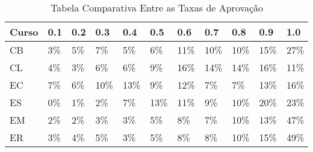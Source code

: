 \begin{table}
\begin{center}
        \begin{tabular}{|p{2cm}| p{1cm}| p{1cm}| p{1cm} | p{1cm} | p{1cm}| p{1cm}
                |p{1cm} | p{1cm} | p{1cm} | p{1cm}|}

        \hline
        \textbf{Curso} & \textbf{0.1} & \textbf{0.2} & \textbf{0.3} & 
        \textbf{0.4} & \textbf{0.5} & \textbf{0.6} & \textbf{0.7} & \textbf{0.8} &
        \textbf{0.9} & \textbf{1.0} \\
        \hline
        \hline
        CB & 3\% & 5\% & 7\% & 5\% & 6\% &
        11\% & 10\% & 10\% & 15\% & 27\% \\
        \hline
        \hline
        CL & 4\% & 3\% & 6\% & 6\% & 9\% &
        16\% & 14\% & 14\% & 16\% & 11\% \\
        \hline
        \hline
        EC & 7\% & 6\% & 10\% & 13\% & 9\% &
        12\% & 7\% & 7\% & 13\% & 16\% \\
        \hline
        \hline
        ES & 0\% & 1\% & 2\% & 7\% & 13\% &
        11\% & 9\% & 10\% & 20\% & 23\% \\
        \hline
        \hline
        EM & 2\% & 2\% & 3\% & 3\% & 5\% &
        8\% & 7\% & 10\% & 13\% & 47\% \\
        \hline
        \hline
        ER & 3\% & 4\% & 5\% & 3\% & 5\% &
        8\% & 8\% & 10\% & 15\% & 49\% \\
        \hline
\end{tabular}
\end{center}
\caption{Tabela Comparativa Entre as Taxas de Aprovação}
\end{table}

